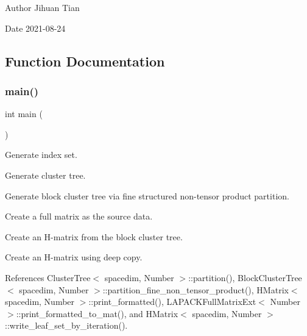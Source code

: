 \begin{DoxyAuthor}{Author}
Jihuan Tian 
\end{DoxyAuthor}
\begin{DoxyDate}{Date}
2021-\/08-\/24 
\end{DoxyDate}


\subsection{Function Documentation}
\mbox{\label{hmatrix-deep-copy-constructor_8cc_ae66f6b31b5ad750f1fe042a706a4e3d4}} 
\subsubsection{\texorpdfstring{main()}{main()}}
{\footnotesize\ttfamily int main (\begin{DoxyParamCaption}{ }\end{DoxyParamCaption})}

Generate index set.

Generate cluster tree.

Generate block cluster tree via fine structured non-\/tensor product partition.

Create a full matrix as the source data.

Create an H-\/matrix from the block cluster tree.

Create an H-\/matrix using deep copy.

References Cluster\+Tree$<$ spacedim, Number $>$\+::partition(), Block\+Cluster\+Tree$<$ spacedim, Number $>$\+::partition\+\_\+fine\+\_\+non\+\_\+tensor\+\_\+product(), H\+Matrix$<$ spacedim, Number $>$\+::print\+\_\+formatted(), L\+A\+P\+A\+C\+K\+Full\+Matrix\+Ext$<$ Number $>$\+::print\+\_\+formatted\+\_\+to\+\_\+mat(), and H\+Matrix$<$ spacedim, Number $>$\+::write\+\_\+leaf\+\_\+set\+\_\+by\+\_\+iteration().

